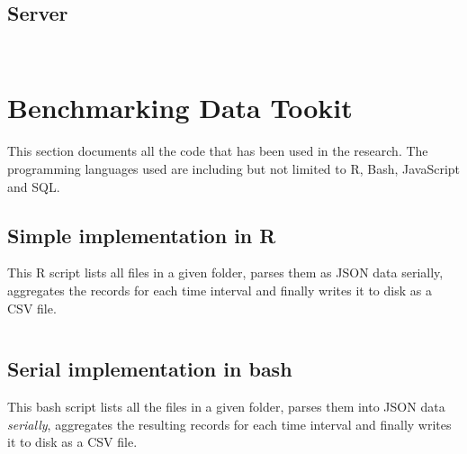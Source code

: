 \subsection{Server} \label{appendix:pilot:server}
\vspace{1em}
\inputminted{javascript}{tools/pilot-study/server-package.json}
\inputminted{javascript}{tools/pilot-study/server-server.js}

\section{Benchmarking Data Tookit} \label{appendix:benchmark}

This section documents all the code that has been used in the research.
The programming languages used are including but not limited to R, Bash, JavaScript and SQL.

\subsection{Simple implementation in R}
This R script lists all files in a given folder, parses them as JSON data serially, aggregates the records for each time interval and finally writes it to disk as a CSV file.
\vspace{1em}
\inputminted{R}{analysis/data-toolkit/old-toolkit.r}

\subsection{Serial implementation in bash}
This bash script lists all the files in a given folder, parses them into JSON data \textit{serially}, aggregates the resulting records for each time interval and finally writes it to disk as a CSV file.
\vspace{1em}
\inputminted{bash}{analysis/data-toolkit/new-toolkit.sh}

